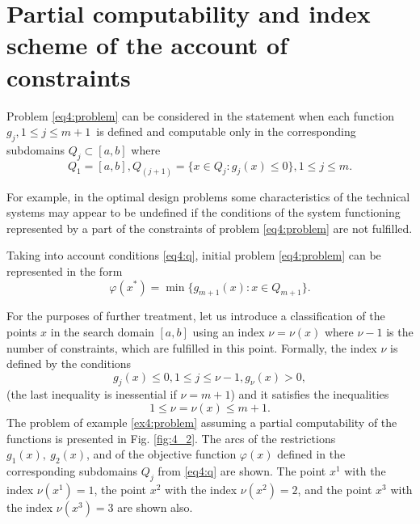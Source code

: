 \section{Partial computability and index scheme of the account of constraints}
Problem \eqref{eq4:problem} can be considered in the statement when each function $g_j,1\le j\le m+1$ is defined and computable only in the corresponding subdomains $Q_j\subset [a,b]$ where
\begin{equation}
  \label{eq4:q}
  Q_1=[a,b],Q_(j+1)=\{x\in Q_j:g_j(x)\le 0\},1\le j\le m.
\end{equation}

For example, in the optimal design problems some characteristics of the technical systems may appear to be undefined if the conditions of the system functioning represented by a part of the constraints of problem \eqref{eq4:problem} are not fulfilled.

Taking into account conditions \eqref{eq4:q}, initial problem \eqref{eq4:problem} can be represented in the form
\begin{equation}
  \label{eq4:problem2}
  \varphi(x^*)=\min\{g_{m+1}(x):x\in Q_{m+1}\}.
\end{equation}

For the purposes of further treatment, let us introduce a classification of the points $x$ in the search domain $[a,b]$ using an index $\nu=\nu(x)$ where $\nu-1$ is the number of constraints, which are fulfilled in this point. Formally, the index $\nu$ is defined by the conditions
\begin{equation}
  \label{eq4:condition}
  g_j(x)\le 0,1\le j \le \nu-1,g_\nu(x)>0,
\end{equation}
(the last inequality is inessential  if $\nu=m+1$) and it satisfies the inequalities
\begin{displaymath}
  1\le\nu=\nu(x)\le m+1.
\end{displaymath}
The problem of example \ref{ex4:problem} assuming a partial computability of the functions is presented in Fig. \ref{fig:4_2}. The arcs of the restrictions $g_1(x),\:g_2(x)$, and of the objective function $\varphi(x)$ defined in the corresponding subdomains $Q_j$ from \eqref{eq4:q} are shown. The point $x^1$ with the index $\nu(x^1)=1$, the point $x^2$ with the index $\nu(x^2)=2$, and the point $x^3$ with the index $\nu(x^3)=3$ are shown also.

